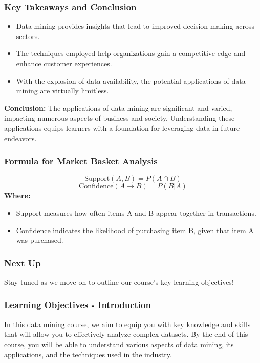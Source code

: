 \documentclass{beamer}
\begin{document}
\begin{frame}[fragile]
    \frametitle{Key Takeaways and Conclusion}
    \begin{itemize}
        \item Data mining provides insights that lead to improved decision-making across sectors.
        \item The techniques employed help organizations gain a competitive edge and enhance customer experiences.
        \item With the explosion of data availability, the potential applications of data mining are virtually limitless.
    \end{itemize}
    \textbf{Conclusion:} The applications of data mining are significant and varied, impacting numerous aspects of business and society. Understanding these applications equips learners with a foundation for leveraging data in future endeavors.
\end{frame}

\begin{frame}[fragile]
    \frametitle{Formula for Market Basket Analysis}
    \begin{equation}
        \text{Support}(A, B) = P(A \cap B)
    \end{equation}
    \begin{equation}
        \text{Confidence}(A \rightarrow B) = P(B | A)
    \end{equation}
    \textbf{Where:}
    \begin{itemize}
        \item Support measures how often items A and B appear together in transactions.
        \item Confidence indicates the likelihood of purchasing item B, given that item A was purchased.
    \end{itemize}
\end{frame}

\begin{frame}[fragile]
    \frametitle{Next Up}
    Stay tuned as we move on to outline our course’s key learning objectives!
\end{frame}

\begin{frame}[fragile]
    \frametitle{Learning Objectives - Introduction}
    In this data mining course, we aim to equip you with key knowledge and skills that will allow you to effectively analyze complex datasets. By the end of this course, you will be able to understand various aspects of data mining, its applications, and the techniques used in the industry.
\end{frame}
\end{document}

